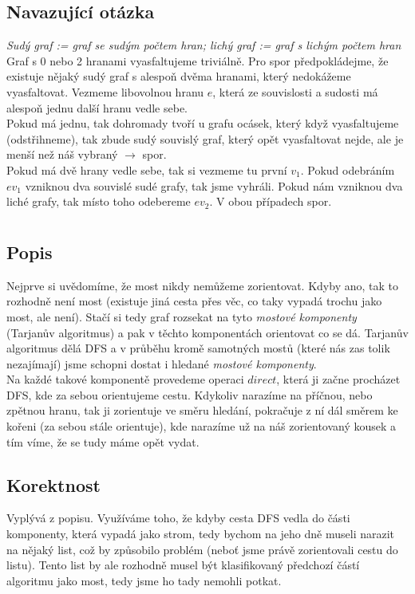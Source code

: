 \documentclass[a4paper]{article}
\begin{document}
\subsection{Navazující otázka}
\textit{Sudý graf := graf se sudým počtem hran; lichý graf := graf s lichým počtem hran} \\
Graf s 0 nebo 2 hranami vyasfaltujeme triviálně. Pro spor předpokládejme, že existuje nějaký sudý graf s alespoň dvěma hranami, který nedokážeme vyasfaltovat. Vezmeme libovolnou hranu $e$, která ze souvislosti a sudosti má alespoň jednu další hranu vedle sebe. \\
Pokud má jednu, tak dohromady tvoří u grafu ocásek, který když vyasfaltujeme (odstřihneme), tak zbude sudý souvislý graf, který opět vyasfaltovat nejde, ale je menší než náš vybraný $\rightarrow$ spor. \\
Pokud má dvě hrany vedle sebe, tak si vezmeme tu první $v_1$. Pokud odebráním $e v_1$ vzniknou dva souvislé sudé grafy, tak jsme vyhráli. Pokud nám vzniknou dva liché grafy, tak místo toho odebereme $e v_2$. V obou případech spor.

\pagebreak
\section{}
\subsection{Popis}
Nejprve si uvědomíme, že most nikdy nemůžeme zorientovat. Kdyby ano, tak to rozhodně není most (existuje jiná cesta přes věc, co taky vypadá trochu jako most, ale není). Stačí si tedy graf rozsekat na tyto \textit{mostové komponenty} (Tarjanův algoritmus) a pak v těchto komponentách orientovat co se dá. Tarjanův algoritmus dělá DFS a v průběhu kromě samotných mostů (které nás zas tolik nezajímají) jsme schopni dostat i hledané \textit{mostové komponenty}. \\
Na každé takové komponentě provedeme operaci $direct$, která ji začne procházet DFS, kde za sebou orientujeme cestu. Kdykoliv narazíme na příčnou, nebo zpětnou hranu, tak ji zorientuje ve směru hledání, pokračuje z ní dál směrem ke kořeni (za sebou stále orientuje), kde narazíme už na náš zorientovaný kousek a tím víme, že se tudy máme opět vydat.
\subsection{Korektnost}
Vyplývá z popisu. Využíváme toho, že kdyby cesta DFS vedla do části komponenty, která vypadá jako strom, tedy bychom na jeho dně museli narazit na nějaký list, což by způsobilo problém (neboť jsme právě zorientovali cestu do listu). Tento list by ale rozhodně musel být klasifikovaný předchozí částí algoritmu jako most, tedy jsme ho tady nemohli potkat.
\end{document}
